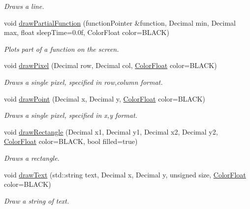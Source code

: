 \begin{DoxyCompactItemize}
\begin{DoxyCompactList}\small\item\em Draws a line. \end{DoxyCompactList}\item 
void \hyperlink{classtsgl_1_1_cartesian_canvas_a8b0d9607230111dd6bef5bf270394b03}{draw\+Partial\+Function} (function\+Pointer \&function, Decimal min, Decimal max, float sleep\+Time=0.\+0f, Color\+Float color=\+B\+L\+A\+C\+K)
\begin{DoxyCompactList}\small\item\em Plots part of a function on the screen. \end{DoxyCompactList}\item 
void \hyperlink{classtsgl_1_1_cartesian_canvas_ad0bdf8651a9f703cfd6f71a6bd6ffe17}{draw\+Pixel} (Decimal row, Decimal col, \hyperlink{structtsgl_1_1_color_float}{Color\+Float} color=B\+L\+A\+C\+K)
\begin{DoxyCompactList}\small\item\em Draws a single pixel, specified in row,column format. \end{DoxyCompactList}\item 
void \hyperlink{classtsgl_1_1_cartesian_canvas_a2ef932501dd03f885fd0ff30ddffae01}{draw\+Point} (Decimal x, Decimal y, \hyperlink{structtsgl_1_1_color_float}{Color\+Float} color=B\+L\+A\+C\+K)
\begin{DoxyCompactList}\small\item\em Draws a single pixel, specified in x,y format. \end{DoxyCompactList}\item 
void \hyperlink{classtsgl_1_1_cartesian_canvas_a5e88e7d751e24ae78d158f1d8e9faf5e}{draw\+Rectangle} (Decimal x1, Decimal y1, Decimal x2, Decimal y2, \hyperlink{structtsgl_1_1_color_float}{Color\+Float} color=B\+L\+A\+C\+K, bool filled=true)
\begin{DoxyCompactList}\small\item\em Draws a rectangle. \end{DoxyCompactList}\item 
void \hyperlink{classtsgl_1_1_cartesian_canvas_a7df01e80ce99d0ce6b45532034c0940c}{draw\+Text} (std\+::string text, Decimal x, Decimal y, unsigned size, \hyperlink{structtsgl_1_1_color_float}{Color\+Float} color=B\+L\+A\+C\+K)
\begin{DoxyCompactList}\small\item\em Draw a string of text. \end{DoxyCompactList}\item 

\end{DoxyCompactItemize}
